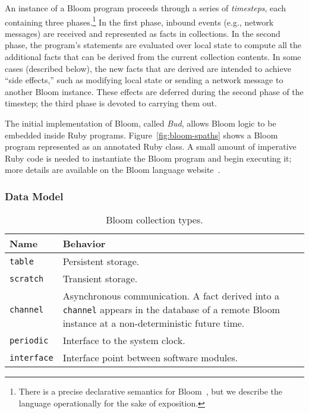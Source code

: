 An instance of a Bloom program proceeds through a series of \emph{timesteps},
each containing three phases.\footnote{There is a precise declarative semantics
  for Bloom~\cite{dedalus}, but we describe the language operationally for the
  sake of exposition.} In the first phase, inbound events (e.g., network
messages) are received and represented as facts in collections. In the second
phase, the program's statements are evaluated over local state to compute all
the additional facts that can be derived from the current collection
contents. In some cases (described below), the new facts that are derived are
intended to achieve ``side effects,'' such as modifying local state or sending a
network message to another Bloom instance.  These effects are deferred during
the second phase of the timestep; the third phase is devoted to carrying them
out.

The initial implementation of Bloom, called \emph{Bud}, allows Bloom logic to be
embedded inside Ruby programs. Figure~\ref{fig:bloom-spaths} shows a Bloom
program represented as an annotated Ruby class. A small amount of imperative
Ruby code is needed to instantiate the Bloom program and begin executing it;
more details are available on the Bloom language website~\cite{bloom}.

\subsubsection{Data Model}
\begin{table}[t]
\begin{tabular}{|l|p{2.32in}|}
\hline
\textbf{Name} & \textbf{Behavior }\\
\hline
\texttt{table} & Persistent storage.\\
\texttt{scratch} & Transient storage.\\
\texttt{channel} & Asynchronous communication. A fact derived into a \texttt{channel} appears in the
database of a remote Bloom instance at a non-deterministic future time.\\
\texttt{periodic} & Interface to the system clock.\\
\texttt{interface} & Interface point between software modules.\\
\hline
\end{tabular}
\caption{Bloom collection types.}
\label{tbl:bloom-collections}
\end{table}

